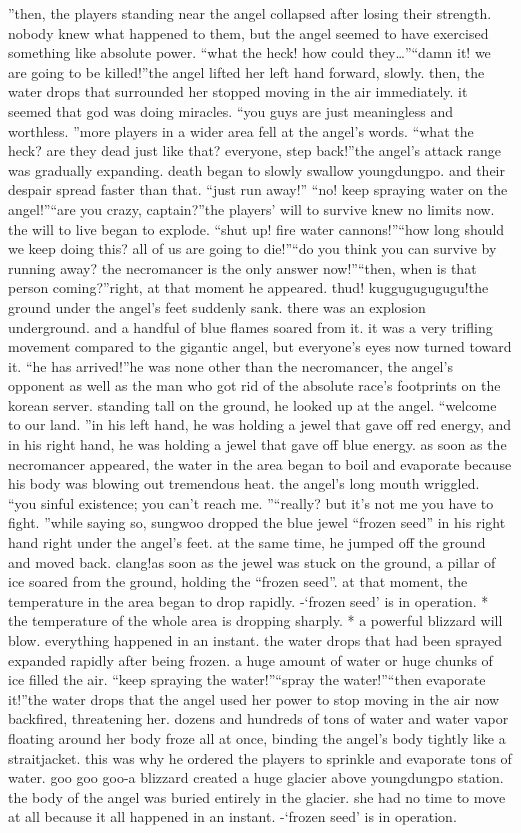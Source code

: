 ”then, the players standing near the angel collapsed after losing their strength.
nobody knew what happened to them, but the angel seemed to have exercised something like absolute power.
“what the heck! how could they…”“damn it! we are going to be killed!”the angel lifted her left hand forward, slowly.
 then, the water drops that surrounded her stopped moving in the air immediately.
 it seemed that god was doing miracles.
“you guys are just meaningless and worthless.
”more players in a wider area fell at the angel’s words.
“what the heck? are they dead just like that? everyone, step back!”the angel’s attack range was gradually expanding.
 death began to slowly swallow youngdungpo.
 and their despair spread faster than that.
“just run away!”
“no! keep spraying water on the angel!”“are you crazy, captain?”the players’ will to survive knew no limits now.
the will to live began to explode.
“shut up! fire water cannons!”“how long should we keep doing this? all of us are going to die!”“do you think you can survive by running away? the necromancer is the only answer now!”“then, when is that person coming?”right, at that moment he appeared.
thud! kuggugugugugu!the ground under the angel’s feet suddenly sank.
 there was an explosion underground.
 and a handful of blue flames soared from it.
 it was a very trifling movement compared to the gigantic angel, but everyone’s eyes now turned toward it.
“he has arrived!”he was none other than the necromancer, the angel’s opponent as well as the man who got rid of the absolute race’s footprints on the korean server.
 standing tall on the ground, he looked up at the angel.
“welcome to our land.
”in his left hand, he was holding a jewel that gave off red energy, and in his right hand, he was holding a jewel that gave off blue energy.
as soon as the necromancer appeared, the water in the area began to boil and evaporate because his body was blowing out tremendous heat.
the angel’s long mouth wriggled.
“you sinful existence; you can’t reach me.
”“really? but it’s not me you have to fight.
”while saying so, sungwoo dropped the blue jewel “frozen seed” in his right hand right under the angel’s feet.
 at the same time, he jumped off the ground and moved back.
clang!as soon as the jewel was stuck on the ground, a pillar of ice soared from the ground, holding the “frozen seed”.
 at that moment, the temperature in the area began to drop rapidly.
-‘frozen seed’ is in operation.
* the temperature of the whole area is dropping sharply.
* a powerful blizzard will blow.
everything happened in an instant.
 the water drops that had been sprayed expanded rapidly after being frozen.
 a huge amount of water or huge chunks of ice filled the air.
“keep spraying the water!”“spray the water!”“then evaporate it!”the water drops that the angel used her power to stop moving in the air now backfired, threatening her.
dozens and hundreds of tons of water and water vapor floating around her body froze all at once, binding the angel’s body tightly like a straitjacket.
this was why he ordered the players to sprinkle and evaporate tons of water.
goo goo goo-a blizzard created a huge glacier above youngdungpo station.
 the body of the angel was buried entirely in the glacier.
 she had no time to move at all because it all happened in an instant.
-‘frozen seed’ is in operation.



